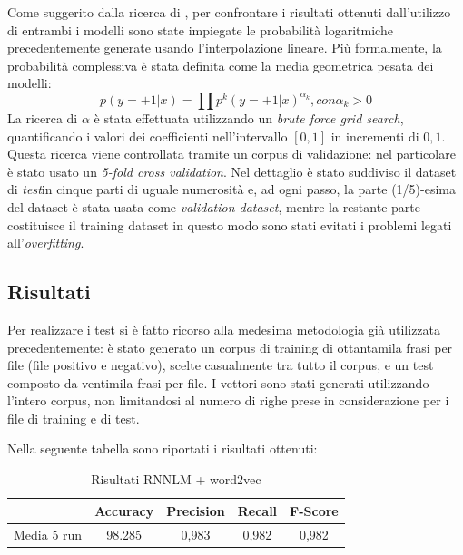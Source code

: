 \documentclass[a4paper,12pt,openright,twoside]{report}
\theoremstyle{definition}
\begin{document}
Come suggerito dalla ricerca di \cite{Mik2014}, per confrontare i risultati ottenuti dall'utilizzo di entrambi i modelli
sono state impiegate le probabilità logaritmiche precedentemente generate usando l'interpolazione lineare.
Più formalmente, la probabilità complessiva  è stata definita come la media geometrica pesata
dei modelli:
\begin{equation}
	p(y=+1|x)=\prod p^k(y=+1|x)^{\alpha_k}, con \alpha_k > 0
	\label{eq:media}
\end{equation}
La ricerca di $\alpha$ è stata effettuata utilizzando un \emph{brute force grid search}, 
quantificando
i valori dei coefficienti nell'intervallo $[0,1]$ in incrementi di $0,1$.
Questa ricerca viene controllata tramite un corpus di validazione: nel particolare
è stato usato un \emph{5-fold cross validation}.
Nel dettaglio è stato suddiviso il dataset di \emph{test}in cinque parti di uguale numerosità e, ad ogni passo, la parte (1/5)-esima del dataset 
è stata usata come \emph{validation dataset}, mentre la restante parte costituisce il training dataset
in questo modo sono stati evitati i problemi legati all'\emph{overfitting}.

\subsection{Risultati}
 
Per realizzare i test si è fatto ricorso alla medesima metodologia già
utilizzata precedentemente: è stato generato
un corpus di training di ottantamila frasi per file (file positivo e negativo),
scelte casualmente tra tutto il corpus, e un test composto da ventimila frasi per file. 
I vettori sono stati generati utilizzando l'intero corpus, non limitandosi 
al numero di righe prese in considerazione per i file di training e di test.

Nella seguente tabella sono riportati i risultati ottenuti:
\begin{table}[H]
\begin{center}
\begin{tabular}{|c|c|c|c|c|}
\hline
 & Accuracy & Precision & Recall & F-Score\\
\hline
Media 5 run & 98.285 &  0,983 & 0,982 & 0,982 \\
\hline
\end{tabular}
\end{center}
\caption{Risultati RNNLM + word2vec}
\label{tab:analisiCongiunte}
\end{table}
\end{document}
